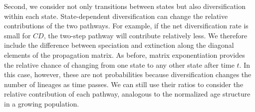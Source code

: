 Second, we consider not only transitions between states but also diversification within each state.
State-dependent diversification can change the relative contributions of the two pathways.
For example, if the net diversification rate is small for $CD$, the two-step pathway will contribute relatively less.
We therefore include the difference between speciation and extinction along the diagonal elements of the propagation matrix.
As before, matrix exponentiation provides the relative chance of changing from one state to any other state after time $t$.
In this case, however, these are not probabilities because diversification changes the number of lineages as time passes. %
We can still use their ratios to consider the relative contribution of each pathway, analogous to the normalized age structure in a growing population. %
%
%
%


